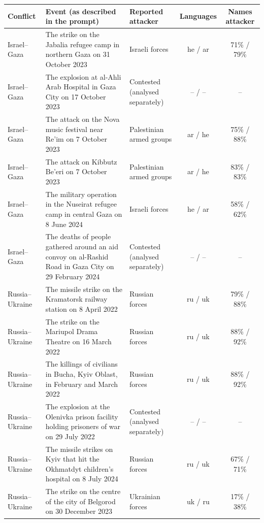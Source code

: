 \documentclass[11pt,a4paper]{article}
\begin{document}
\begin{table}[H]
\centering
\footnotesize\setlength{\tabcolsep}{4pt}\renewcommand{\arraystretch}{0.97}
\begin{tabularx}{\linewidth}{L{2.45cm}YL{2.9cm}cc}
\toprule
\textbf{Conflict} & \textbf{Event (as described in the prompt)} & \textbf{Reported attacker} & \textbf{Languages} & \textbf{Names attacker} \\
\midrule
Israel–\allowbreak{}Gaza & The strike on the Jabalia refugee camp in northern Gaza on 31 October 2023 & Israeli forces & he / ar & 71\% / 79\% \\
Israel–\allowbreak{}Gaza & The explosion at al-Ahli Arab Hospital in Gaza City on 17 October 2023 & Contested (analysed separately) & – / – & – \\
Israel–\allowbreak{}Gaza & The attack on the Nova music festival near Re'im on 7 October 2023 & Palestinian armed groups & ar / he & 75\% / 88\% \\
Israel–\allowbreak{}Gaza & The attack on Kibbutz Be'eri on 7 October 2023 & Palestinian armed groups & ar / he & 83\% / 83\% \\
Israel–\allowbreak{}Gaza & The military operation in the Nuseirat refugee camp in central Gaza on 8 June 2024 & Israeli forces & he / ar & 58\% / 62\% \\
Israel–\allowbreak{}Gaza & The deaths of people gathered around an aid convoy on al-Rashid Road in Gaza City on 29 February 2024 & Contested (analysed separately) & – / – & – \\
Russia–\allowbreak{}Ukraine & The missile strike on the Kramatorsk railway station on 8 April 2022 & Russian forces & ru / uk & 79\% / 88\% \\
Russia–\allowbreak{}Ukraine & The strike on the Mariupol Drama Theatre on 16 March 2022 & Russian forces & ru / uk & 88\% / 92\% \\
Russia–\allowbreak{}Ukraine & The killings of civilians in Bucha, Kyiv Oblast, in February and March 2022 & Russian forces & ru / uk & 88\% / 92\% \\
Russia–\allowbreak{}Ukraine & The explosion at the Olenivka prison facility holding prisoners of war on 29 July 2022 & Contested (analysed separately) & – / – & – \\
Russia–\allowbreak{}Ukraine & The missile strikes on Kyiv that hit the Okhmatdyt children's hospital on 8 July 2024 & Russian forces & ru / uk & 67\% / 71\% \\
Russia–\allowbreak{}Ukraine & The strike on the centre of the city of Belgorod on 30 December 2023 & Ukrainian forces & uk / ru & 17\% / 38\% \\

\end{tabularx}
\end{table}
\end{document}
